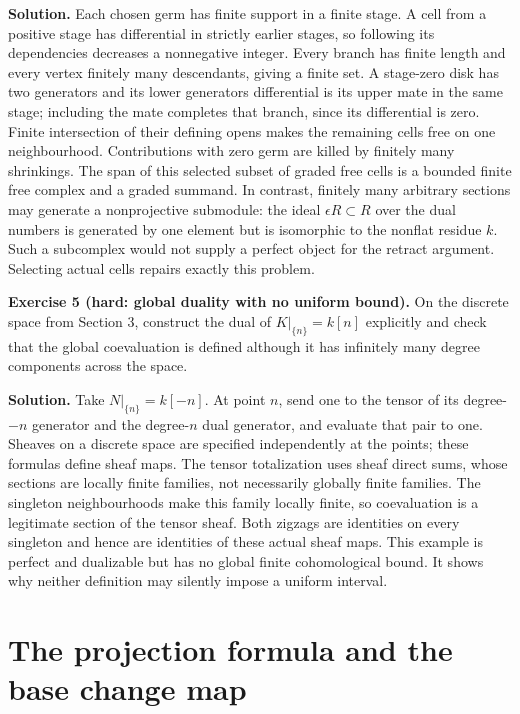 \documentclass[
  english,
  11pt,
  a4paper,
]{article}
\begin{document}
\textbf{Solution.} Each chosen germ has finite support in a finite
stage. A cell from a positive stage has differential in strictly earlier
stages, so following its dependencies decreases a nonnegative integer.
Every branch has finite length and every vertex finitely many
descendants, giving a finite set. A stage-zero disk has two generators
and its lower generator\textquotesingle s differential is its upper mate
in the same stage; including the mate completes that branch, since its
differential is zero. Finite intersection of their defining opens makes
the remaining cells free on one neighbourhood. Contributions with zero
germ are killed by finitely many shrinkings. The span of this selected
subset of graded free cells is a bounded finite free complex and a
graded summand. In contrast, finitely many arbitrary sections may
generate a nonprojective submodule: the ideal \(\epsilon R\subset R\)
over the dual numbers is generated by one element but is isomorphic to
the nonflat residue \(k\). Such a subcomplex would not supply a perfect
object for the retract argument. Selecting actual cells repairs exactly
this problem.

\textbf{Exercise 5 (hard: global duality with no uniform bound).} On the
discrete space from Section 3, construct the dual of \(K|_{\{n\}}=k[n]\)
explicitly and check that the global coevaluation is defined although it
has infinitely many degree components across the space.

\textbf{Solution.} Take \(N|_{\{n\}}=k[-n]\). At point \(n\), send one
to the tensor of its degree-\(-n\) generator and the degree-\(n\) dual
generator, and evaluate that pair to one. Sheaves on a discrete space
are specified independently at the points; these formulas define sheaf
maps. The tensor totalization uses sheaf direct sums, whose sections are
locally finite families, not necessarily globally finite families. The
singleton neighbourhoods make this family locally finite, so
coevaluation is a legitimate section of the tensor sheaf. Both zigzags
are identities on every singleton and hence are identities of these
actual sheaf maps. This example is perfect and dualizable but has no
global finite cohomological bound. It shows why neither definition may
silently impose a uniform interval.

\section{The projection formula and the base change
map}\label{projection-formula-and-base-change}
\end{document}
